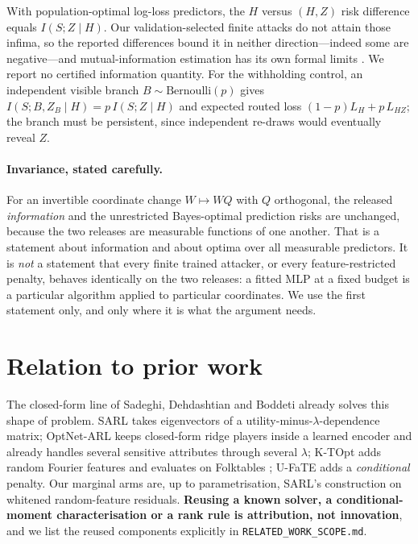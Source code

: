 \documentclass[10pt]{article}
\begin{document}
With population-optimal log-loss predictors, the $H$ versus $(H,Z)$ risk difference equals
$I(S;Z\mid H)$. Our validation-selected finite attacks do not attain those infima, so the reported
differences bound it in neither direction---indeed some are negative---and mutual-information
estimation has its own formal limits \citep{mcallester2020formal}. We report no certified
information quantity. For the withholding control, an independent visible branch
$B\sim\mathrm{Bernoulli}(p)$ gives $I(S;B,Z_B\mid H)=p\,I(S;Z\mid H)$ and expected routed loss
$(1-p)L_H+p\,L_{HZ}$; the branch must be persistent, since independent re-draws would eventually
reveal $Z$.

\paragraph{Invariance, stated carefully.} For an invertible coordinate change $W\mapsto WQ$ with
$Q$ orthogonal, the released \emph{information} and the unrestricted Bayes-optimal prediction risks
are unchanged, because the two releases are measurable functions of one another. That is a
statement about information and about optima over all measurable predictors. It is \emph{not} a
statement that every finite trained attacker, or every feature-restricted penalty, behaves
identically on the two releases: a fitted MLP at a fixed budget is a particular algorithm applied
to particular coordinates. We use the first statement only, and only where it is what the argument
needs.

\section{Relation to prior work}
\label{sec:related}

The closed-form line of Sadeghi, Dehdashtian and Boddeti already solves this shape of problem. SARL
\citep{sadeghi2019sarl} takes eigenvectors of a utility-minus-$\lambda$-dependence matrix;
OptNet-ARL \citep{sadeghi2021optnetarl} keeps closed-form ridge players inside a learned encoder
and already handles several sensitive attributes through several $\lambda$; K-TOpt
\citep{sadeghi2022ktopt} adds random Fourier features and evaluates on Folktables
\citep{ding2021retiring}; U-FaTE \citep{dehdashtian2024ufate} adds a \emph{conditional} penalty.
Our marginal arms are, up to parametrisation, SARL's construction on whitened random-feature
residuals. \textbf{Reusing a known solver, a conditional-moment characterisation or a rank rule is
attribution, not innovation}, and we list the reused components explicitly in
\texttt{RELATED\_WORK\_SCOPE.md}.
\end{document}
